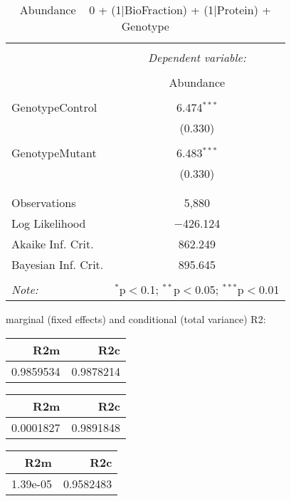 \documentclass[11pt]{report}
\begin{document}
\begin{table}[!htbp] \centering 
  \caption{Abundance ~ 0 + (1|BioFraction) + (1|Protein) + Genotype} 
  \label{} 
\begin{tabular}{@{\extracolsep{5pt}}lc} 
\\[-1.8ex]\hline 
\hline \\[-1.8ex] 
 & \multicolumn{1}{c}{\textit{Dependent variable:}} \\ 
\cline{2-2} 
\\[-1.8ex] & Abundance \\ 
\hline \\[-1.8ex] 
 GenotypeControl & 6.474$^{***}$ \\ 
  & (0.330) \\ 
  & \\ 
 GenotypeMutant & 6.483$^{***}$ \\ 
  & (0.330) \\ 
  & \\ 
\hline \\[-1.8ex] 
Observations & 5,880 \\ 
Log Likelihood & $-$426.124 \\ 
Akaike Inf. Crit. & 862.249 \\ 
Bayesian Inf. Crit. & 895.645 \\ 
\hline 
\hline \\[-1.8ex] 
\textit{Note:}  & \multicolumn{1}{r}{$^{*}$p$<$0.1; $^{**}$p$<$0.05; $^{***}$p$<$0.01} \\ 
\end{tabular} 
\end{table} 
marginal (fixed effects) and conditional (total variance) R2:

\begin{tabular}{r|r}
\hline
R2m & R2c\\
\hline
0.9859534 & 0.9878214\\
\hline
\end{tabular}

\begin{tabular}{r|r}
\hline
R2m & R2c\\
\hline
0.0001827 & 0.9891848\\
\hline
\end{tabular}

\begin{tabular}{r|r}
\hline
R2m & R2c\\
\hline
1.39e-05 & 0.9582483\\
\hline
\end{tabular}
\end{document}
